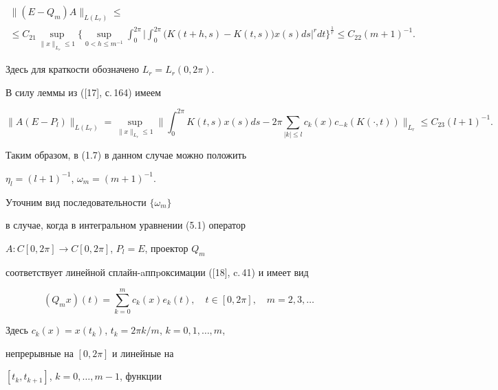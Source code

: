 \begin{gather*}


\| (E-Q_m)A \|_{L(L_r)} \leq \\


%


\leq C_{21} \sup \limits_{\| x \|_{L_r} \leq 1}


\bigg \{ \sup \limits_{0<h \leq m^{-1}} \int^{2 \pi}_0


\bigg | \int^{2 \pi}_0 \big( K(t+h,s)-K(t,s) \big)


x(s) ds \bigg |^r dt \bigg \}^{\frac{1}{r}} \leq


C_{22} {(m+1)}^{-1}.


\end{gather*}


Здесь для краткости обозначено $L_r=L_r (0, 2 \pi)$.


В силу леммы из ([17], с.\,164) имеем


$$


\| A(E-P_l) \|_{L(L_r)}= \sup \limits_{\| x \|_{L_r} \leq 1}


\bigg \| \int^{2 \pi}_0 K(t,s) x(s) ds


- 2 \pi \sum_{| k |\leq l} c_k(x)


c_{-k}(K(\cdot, t)) \bigg \|_{L_r} \leq C_{23}(l+1)^{-1}.


$$


Таким образом, в (1.7) в данном случае можно положить


$\eta_l = (l+1)^{-1}$, $\omega_m = (m+1)^{-1}$.





Уточним вид последовательности $\{ \omega_m \}$


в случае, когда в интегральном уравнении (5.1) оператор


$A:C[0, 2 \pi] \to C[0, 2 \pi]$, $P_l = E$, проектор $Q_m$ 


соответствует линейной сплайн-aппpоксимации ([18], c.\,41) и имеет вид


$$


(Q_m x)(t)= \sum_{k=0}^m c_k(x) e_k(t),


\quad t \in [0, 2 \pi], \quad m=2, 3, \dotsc


$$


Здесь $c_k(x)= x(t_k)$, $t_k=2\pi k/m$, $k=0, 1,\dotsc, m$,


непрерывные на $[0, 2\pi]$ и линейные на


$[t_k, t_{k+1}]$, $k=0, \dotsc, m-1$, функции


